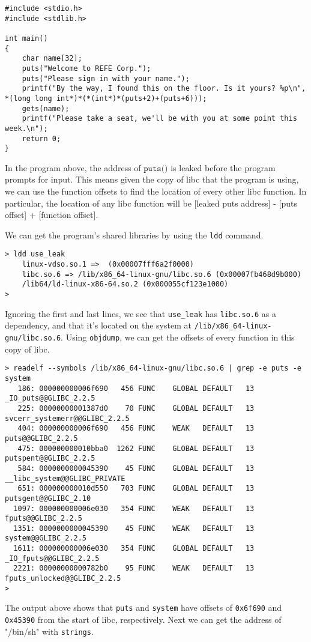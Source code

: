 \begin{lstlisting}
#include <stdio.h>
#include <stdlib.h>

int main()
{
	char name[32];
	puts("Welcome to REFE Corp.");
	puts("Please sign in with your name.");
    printf("By the way, I found this on the floor. Is it yours? %p\n", *(long long int*)*(*(int*)*(puts+2)+(puts+6)));
	gets(name);
	printf("Please take a seat, we'll be with you at some point this week.\n");
	return 0;
}
\end{lstlisting}

In the program above, the address of $\texttt{puts()}$ is leaked before the
program prompts for input. This means given the copy of libc that the program is
using, we can use the function offsets to find the location of every other libc
function. In particular, the location of any libc function will be
[leaked puts address] - [puts offset] + [function offset].

We can get the program's shared libraries by using the \texttt{ldd} command.
\begin{lstlisting}
> ldd use_leak
	linux-vdso.so.1 =>  (0x00007fff6a2f0000)
	libc.so.6 => /lib/x86_64-linux-gnu/libc.so.6 (0x00007fb468d9b000)
	/lib64/ld-linux-x86-64.so.2 (0x000055cf123e1000)
> 
\end{lstlisting}

Ignoring the first and last lines, we see that \texttt{use\_leak} has
\texttt{libc.so.6} as a dependency, and that it's located on the system at
\texttt{/lib/x86\_64-linux-gnu/libc.so.6}. Using \texttt{objdump}, we can get the
offsets of every function in this copy of libc.
\begin{lstlisting}
> readelf --symbols /lib/x86_64-linux-gnu/libc.so.6 | grep -e puts -e system
   186: 000000000006f690   456 FUNC    GLOBAL DEFAULT   13 _IO_puts@@GLIBC_2.2.5
   225: 00000000001387d0    70 FUNC    GLOBAL DEFAULT   13 svcerr_systemerr@@GLIBC_2.2.5
   404: 000000000006f690   456 FUNC    WEAK   DEFAULT   13 puts@@GLIBC_2.2.5
   475: 000000000010bba0  1262 FUNC    GLOBAL DEFAULT   13 putspent@@GLIBC_2.2.5
   584: 0000000000045390    45 FUNC    GLOBAL DEFAULT   13 __libc_system@@GLIBC_PRIVATE
   651: 000000000010d550   703 FUNC    GLOBAL DEFAULT   13 putsgent@@GLIBC_2.10
  1097: 000000000006e030   354 FUNC    WEAK   DEFAULT   13 fputs@@GLIBC_2.2.5
  1351: 0000000000045390    45 FUNC    WEAK   DEFAULT   13 system@@GLIBC_2.2.5
  1611: 000000000006e030   354 FUNC    GLOBAL DEFAULT   13 _IO_fputs@@GLIBC_2.2.5
  2221: 00000000000782b0    95 FUNC    WEAK   DEFAULT   13 fputs_unlocked@@GLIBC_2.2.5
> 
\end{lstlisting}
The output above shows that \texttt{puts} and \texttt{system} have offsets of
\texttt{0x6f690} and \texttt{0x45390} from the start of libc,
respectively. Next we can get the address of "/bin/sh" with \texttt{strings}.

